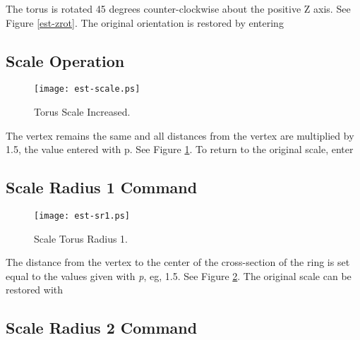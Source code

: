 The torus is rotated 45 degrees counter-clockwise about the positive Z axis.
See Figure \ref{est-zrot}.
The original orientation is restored by entering


\subsection{Scale Operation}

\begin{figure}
\centering \texttt{[image: est-scale.ps]}
\caption{Torus Scale Increased.}
\label{est-scale}
\end{figure}


The vertex remains the same and all distances from the vertex are
multiplied by 1.5, the value entered with p.  See Figure \ref{est-scale}.
To return to the original scale, enter


\subsection{Scale Radius 1 Command}

\begin{figure}
\centering \texttt{[image: est-sr1.ps]}
\caption{Scale Torus Radius 1.}
\label{est-sr1}
\end{figure}


The distance from the vertex to the center of the cross-section of the
ring is set equal to the values given with {\em p}, eg, 1.5.
See Figure \ref{est-sr1}.
The original scale can be restored with


\subsection{Scale Radius 2 Command}

